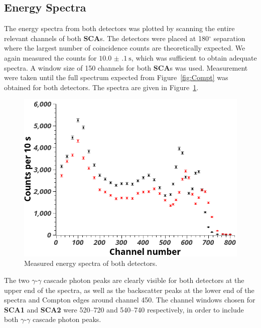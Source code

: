 \documentclass[twocolumn]{article}
\begin{document}
\subsection{Energy Spectra}
The energy spectra from both detectors was plotted by scanning the entire relevant channels of both \textbf{SCA}s. The detectors were placed at 180$^{\circ}$ separation where the largest number of coincidence counts are theoretically expected. We again measured the counts for $\SI[separate-uncertainty = true]{10.0(1) }{\second}$, which was sufficient to obtain adequate spectra. A window size of 150 channels for both \textbf{SCA}s was used. Measurement were taken until the full spectrum expected from Figure~\ref{fig:Compt} was obtained for both detectors. The spectra are given in Figure~\ref{fig:spectra}.
\begin{figure}[!h]
	\centering
	\includegraphics[width=0.9\linewidth]{detectors3.png}
	\caption{Measured energy spectra of both detectors.}
	\label{fig:spectra}
\end{figure}
The two $\gamma$-$\gamma$ cascade photon peaks are clearly visible for both detectors at the upper end of the spectra, as well as the backscatter peaks at the lower end of the spectra and Compton edges around channel 450. The channel windows chosen for \textbf{SCA1} and \textbf{SCA2} were 520--720 and 540--740 respectively, in order to include both $\gamma$-$\gamma$ cascade photon peaks.
\end{document}

